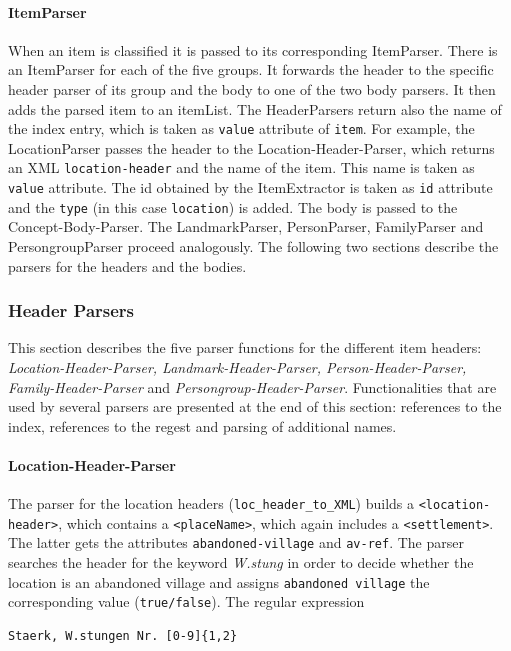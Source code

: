 \paragraph{ItemParser}
When an item is classified it is passed to its corresponding ItemParser. There is an ItemParser for each of the five groups. It forwards the header to the specific header parser of its group and the body to one of the two body parsers. It then adds the parsed item to an itemList. The HeaderParsers return also the name of the index entry, which is taken as \texttt{value} attribute of \texttt{item}. For example, the LocationParser passes the header to the Location-Header-Parser, which returns an XML \texttt{location-header} and the name of the item. This name is taken as \texttt{value} attribute. The id obtained by the ItemExtractor is taken as \texttt{id} attribute and the \texttt{type} (in this case \texttt{location}) is added. The body is passed to the Concept-Body-Parser. The LandmarkParser, PersonParser, FamilyParser and PersongroupParser proceed analogously. The following two sections describe the parsers for the headers and the bodies.


\subsubsection{Header Parsers}
This section describes the five parser functions for the different item headers: \textit{Location-Header-Parser, Landmark-Header-Parser, Person-Header-Parser, Family-Header-Parser} and \textit{Persongroup-Header-Parser}. Functionalities that are used by several parsers are presented at the end of this section: references to the index, references to the regest and parsing of additional names.

\paragraph{Location-Header-Parser}
The parser for the location headers (\texttt{loc\_header\_to\_XML}) builds a \texttt{<location-header>}, which contains a \texttt{<placeName>}, which again includes a \texttt{<settlement>}. The latter gets the attributes \texttt{abandoned-village} and \texttt{av-ref}. The parser searches the header for the keyword \textit{W.stung} in order to decide whether the location is an abandoned village and assigns \texttt{abandoned village} the corresponding value (\texttt{true/false}). The regular expression 

\begin{verbatim}
Staerk, W.stungen Nr. [0-9]{1,2} 
\end{verbatim}

